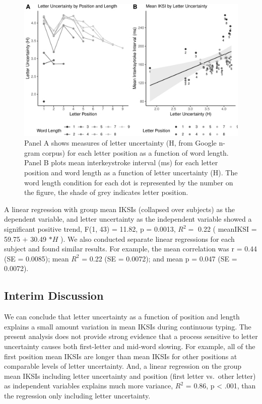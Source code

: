 \documentclass[floatsintext,man]{apa6}
\theoremstyle{definition}
\theoremstyle{definition}
\theoremstyle{definition}
\theoremstyle{remark}
\begin{document}
\begin{figure}[htbp]
\centering
\includegraphics{Entropy_typing_draft_files/figure-latex/letter-uncertainty-by-IKSI-1.pdf}
\caption{\label{fig:letter-uncertainty-by-IKSI}Panel A shows measures of letter
uncertainty (H, from Google n-gram corpus) for each letter position as a
function of word length. Panel B plots mean interkeystroke interval (ms)
for each letter position and word length as a function of letter
uncertainty (H). The word length condition for each dot is represented
by the number on the figure, the shade of grey indicates letter
position.}
\end{figure}

A linear regression with group mean IKSIs (collapsed over subjects) as
the dependent variable, and letter uncertainty as the independent
variable showed a significant positive trend, F(1, 43) = 11.82, p =
0.0013, \(R^2 =\) 0.22 ( meanIKSI = 59.75 \(+\) 30.49 \(* H\) ). We also
conducted separate linear regressions for each subject and found similar
results. For example, the mean correlation was r = 0.44 (SE = 0.0085);
mean \(R^2\) = 0.22 (SE = 0.0072); and mean p = 0.047 (SE = 0.0072).

\subsection{Interim Discussion}\label{interim-discussion}

We can conclude that letter uncertainty as a function of position and
length explains a small amount variation in mean IKSIs during continuous
typing. The present analysis does not provide strong evidence that a
process sensitive to letter uncertainty causes both first-letter and
mid-word slowing. For example, all of the first position mean IKSIs are
longer than mean IKSIs for other positions at comparable levels of
letter uncertainty. And, a linear regression on the group mean IKSIs
including letter uncertainty and position (first letter vs.~other
letter) as independent variables explains much more variance, \(R^2\) =
0.86, p \textless{} .001, than the regression only including letter
uncertainty.
\end{document}
